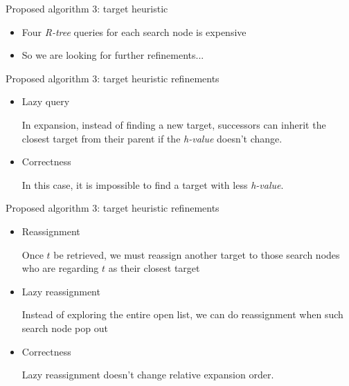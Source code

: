 \begin{frame}{Proposed algorithm 3: target heuristic}
\begin{minipage}{.9\textwidth}
\begin{itemize}
    \item \small{Four \textit{R-tree} queries for each search  node is expensive}
    \item \small{So we are looking for further refinements...}
\end{itemize}
\end{minipage}%
\end{frame}

\begin{frame}{Proposed algorithm 3: target heuristic refinements}
\begin{minipage}{.9\textwidth}
\begin{itemize}
    \item \small{Lazy query}
    \begin{Definition}
        In expansion, instead of finding a new target, successors can inherit the closest target from their parent if the \textit{h-value} doesn't change.
    \end{Definition}
    \item \small{Correctness}
    \begin{lemma}
        In this case, it is impossible to find a target with less \textit{h-value}.
    \end{lemma}
\end{itemize}
\end{minipage}%
\end{frame}

\begin{frame}{Proposed algorithm 3: target heuristic refinements}
\begin{minipage}{.9\textwidth}
\begin{itemize}
    \item \small{Reassignment}
    \begin{definition}
        \small Once $t$ be retrieved, we must reassign another target to those search nodes who are regarding $t$ as their closest target
    \end{definition}
    \item \small{Lazy reassignment}
    \begin{definition}
        \small Instead of exploring the entire open list, we can do reassignment when such search node pop out
    \end{definition}
    \item \small{Correctness}
    \begin{lemma}
        \small Lazy reassignment doesn't change relative expansion order.
    \end{lemma}
\end{itemize}
\end{minipage}%
\end{frame}